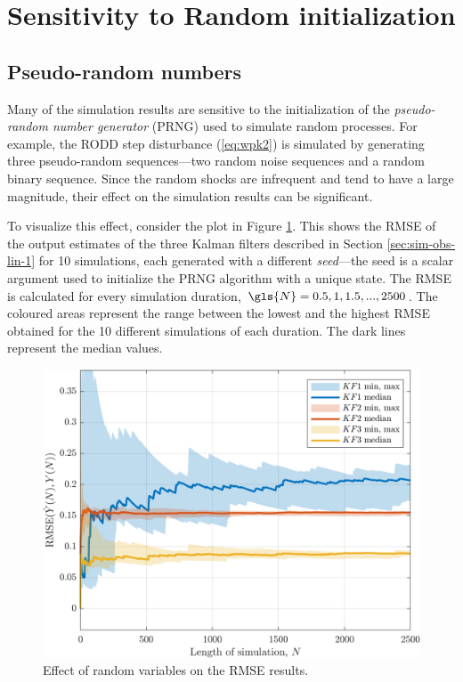 \section{Sensitivity to Random initialization} \label{sec:random-init}

\subsection{Pseudo-random numbers}

Many of the simulation results are sensitive to the initialization of the \textit{pseudo-random number generator} (\gls{PRNG}) used to simulate random processes. For example, the \gls{RODD} step disturbance (\ref{eq:wpk2}) is simulated by generating three pseudo-random sequences---two random noise sequences and a random binary sequence. Since the random shocks are infrequent and tend to have a large magnitude, their effect on the simulation results can be significant.

To visualize this effect, consider the plot in Figure \ref{fig:rod-obs-sim-1-3KF-seed-crmse-statsplot}. This shows the \gls{RMSE} of the output estimates of the three Kalman filters described in Section \ref{sec:sim-obs-lin-1} for 10 simulations, each generated with a different \textit{seed}—the seed is a scalar argument used to initialize the \gls{PRNG} algorithm with a unique state. The \gls{RMSE} is calculated for every simulation duration, $\gls{N}=0.5,1,1.5,...,2500$. The coloured areas represent the range between the lowest and the highest \gls{RMSE} obtained for the 10 different simulations of each duration. The dark lines represent the median values.

\begin{figure}[htp]
	\centering
	\includegraphics[width=14cm]{images/rod_obs_sim1_3KF_seed_crmse_statsplot.png}  %
	\caption{Effect of random variables on the \gls{RMSE} results.}
	\label{fig:rod-obs-sim-1-3KF-seed-crmse-statsplot}
\end{figure}  %

